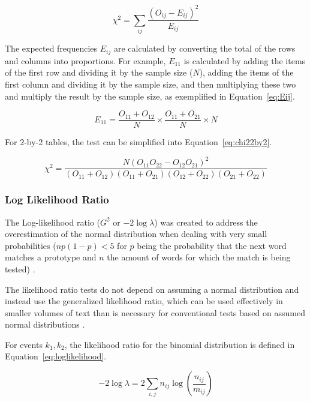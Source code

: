 \begin{equation}
  \label{eq:chi2}
  \chi^2 = \sum_{ij} \frac{(O_{ij} - E_{ij})^2}{E_{ij}}
\end{equation}

The expected frequencies $E_{ij}$ are calculated by converting the total of the
rows and columns into proportions. For example, $E_{11}$ is calculated by adding
the items of the first row and dividing it by the sample size ($N$), adding the
items of the first column and dividing it by the sample size, and then
multiplying these two and multiply the result by the sample size, as exemplified
in Equation~\ref{eq:Eij}.

\begin{equation}
  \label{eq:Eij}
  E_{11} = \frac{O_{11} + O_{12}}{N} \times \frac{O_{11} + O_{21}}{N} \times N
\end{equation}

For 2-by-2 tables, the test can be simplified into Equation~\ref{eq:chi22by2}.

\begin{equation}
  \label{eq:chi22by2}
  \chi^2 =  \frac{N(O_{11}O_{22} - O_{12}O_{21})^2}
            {(O_{11} + O_{12}) (O_{11} + O_{21})
             (O_{12} + O_{22}) (O_{21} + O_{22})}
\end{equation}


\subsubsection*{Log Likelihood Ratio}
\label{subsec:loglikeliood}

The Log-likelihood ratio ($G^2$ or $-2\log\lambda$) was created to address the
overestimation of the normal distribution when dealing with very small
probabilities ($np(1 - p) < 5$ for $p$ being the probability that the next word
matches a prototype and $n$ the amount of words for which the match is being
tested) \citep{dunning1993accurate}.

The likelihood ratio tests do not depend on assuming a normal distribution and
instead use the generalized likelihood ratio, which can be used effectively in
smaller volumes of text than is necessary for conventional tests based on
assumed normal distributions \citep{dunning1993accurate}.

For events $k_1,k_2$, the likelihood ratio for the binomial distribution is
defined in Equation~\ref{eq:loglikelihood}.

\begin{equation}
  \label{eq:loglikelihood}
  -2\log\lambda = 2 \sum_{i,j} n_{ij} \log \left( \frac{n_{ij}}{m_{ij}} \right)
\end{equation}


